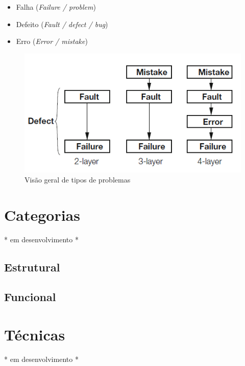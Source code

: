 \documentclass[
	12pt,				%
	openright,			%
	oneside,			%
	a4paper,			%
	english,			%
	brazil,				%
	]{abntex2}
\begin{document}

\begin{itemize}
    \item Falha (\emph{Failure / problem})
    \item Defeito (\emph{Fault / defect / bug})
    \item Erro (\emph{Error / mistake})
\end{itemize}

\begin{figure}[h]
    \centering
    \graphicspath{ {./graphics/} }
    \includegraphics[scale=0.8]{defeito_falha_erro}
    \caption{Visão geral de tipos de problemas}
    \label{fig:tipos_problemas}
\end{figure}

\section{Categorias}
* em desenvolvimento *

\subsection{Estrutural}

\subsection{Funcional}



\section{Técnicas}
* em desenvolvimento *
\end{document}
